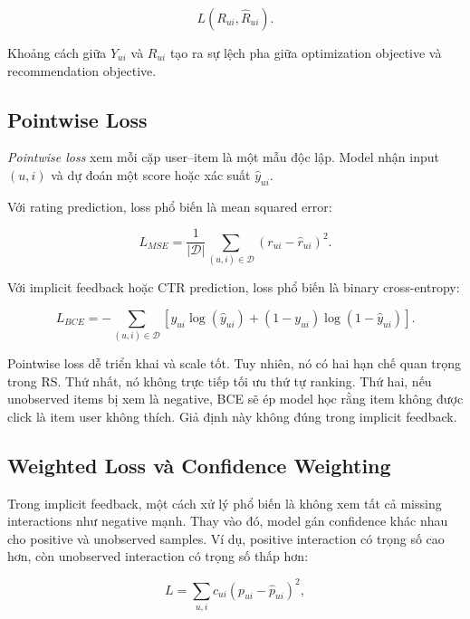\documentclass[12pt,a4paper]{article}
\begin{document}
\begin{equation}
L(R_{ui}, \hat{R}_{ui}).
\end{equation}

Khoảng cách giữa $Y_{ui}$ và $R_{ui}$ tạo ra sự lệch pha giữa optimization objective và recommendation objective.

\subsection{Pointwise Loss}

\textit{Pointwise loss} xem mỗi cặp user--item là một mẫu độc lập. Model nhận input $(u,i)$ và dự đoán một score hoặc xác suất $\hat{y}_{ui}$.

Với rating prediction, loss phổ biến là mean squared error:

\begin{equation}
L_{MSE} = \frac{1}{|\mathcal{D}|} \sum_{(u,i) \in \mathcal{D}} (r_{ui} - \hat{r}_{ui})^2.
\end{equation}

Với implicit feedback hoặc CTR prediction, loss phổ biến là binary cross-entropy:

\begin{equation}
L_{BCE} = - \sum_{(u,i) \in \mathcal{D}} \left[y_{ui}\log(\hat{y}_{ui}) + (1-y_{ui})\log(1-\hat{y}_{ui})\right].
\end{equation}

Pointwise loss dễ triển khai và scale tốt. Tuy nhiên, nó có hai hạn chế quan trọng trong RS. Thứ nhất, nó không trực tiếp tối ưu thứ tự ranking. Thứ hai, nếu unobserved items bị xem là negative, BCE sẽ ép model học rằng item không được click là item user không thích. Giả định này không đúng trong implicit feedback.

\subsection{Weighted Loss và Confidence Weighting}

Trong implicit feedback, một cách xử lý phổ biến là không xem tất cả missing interactions như negative mạnh. Thay vào đó, model gán confidence khác nhau cho positive và unobserved samples. Ví dụ, positive interaction có trọng số cao hơn, còn unobserved interaction có trọng số thấp hơn:

\begin{equation}
L = \sum_{u,i} c_{ui}(p_{ui} - \hat{p}_{ui})^2,
\end{equation}
\end{document}
